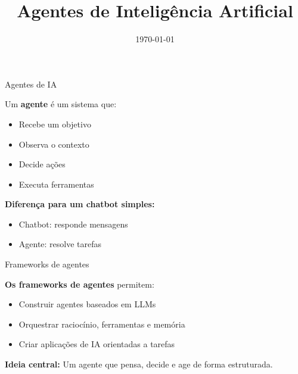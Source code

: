 \documentclass{beamer}
\title{Agentes de Inteligência Artificial}
\date{\today}
\begin{document}
    


\begin{frame}{Agentes de IA}
    
    Um \textbf{agente} é um sistema que:
    \begin{itemize}
        \item Recebe um objetivo
        \item Observa o contexto
        \item Decide ações
        \item Executa ferramentas
    \end{itemize}
    
    \vspace{0.3cm}
    
    \textbf{Diferença para um chatbot simples:}
    \begin{itemize}
        \item Chatbot: responde mensagens
        \item Agente: resolve tarefas
    \end{itemize}
    
\end{frame}

\begin{frame}{Frameworks de agentes}
    
    \textbf{Os frameworks de agentes} permitem:
    \begin{itemize}
        \item Construir agentes baseados em LLMs
        \item Orquestrar raciocínio, ferramentas e memória
        \item Criar aplicações de IA orientadas a tarefas
    \end{itemize}
    
    \vspace{0.3cm}
    
    \textbf{Ideia central:}  
    Um agente que pensa, decide e age de forma estruturada.
    
\end{frame}
\end{document}
